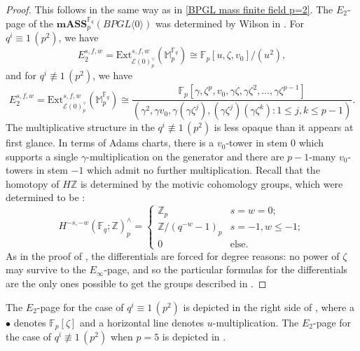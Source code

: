 \documentclass{amsart}
\theoremstyle{plain}
\numberwithin{theorem}{section}
\numberwithin{equation}{section}
\numberwithin{figure}{section}
\newcommand{\0}{\langle 0 \rangle }
\begin{document}
\begin{proof}
    This follows in the same way as in \cref{BPGL mass finite field p=2}. The $E_2$-page of the $\textbf{mASS}^{\mathbb{F}_q}_p(BPGL \langle 0 \rangle)$ was determined by Wilson in \cite[Proposition 6.4, Proposition 7.7]{Wilson16}. For $q^i \equiv 1 \, (p^2)$, we have
    \[E_2^{s,f,w}=\text{Ext}^{s,f,w}_{\mathcal{E}(0)^\vee_p}(\mathbb{M}_p^{\mathbb{F}_q}) \cong        \mathbb{F}_p[u, \zeta, v_0]/(u^2), \]
    and for $q^i \not\equiv 1 \, (p^2)$, we have
    \[E_2^{s,f,w}=\text{Ext}_{\mathcal{E}(0)^\vee_p}^{s,f,w}(\mathbb{M}_p^{\mathbb{F}_q}) \cong \frac{\mathbb{F}_p[\gamma, \zeta^p, v_0, \gamma\zeta, \gamma\zeta^2, \dots, \gamma\zeta^{p-1}]}{(\gamma^2, \gamma v_0, \gamma(\gamma\zeta^j), (\gamma\zeta^j)(\gamma\zeta^k) : 1 \leq j, k \leq p-1)}.\]
    The multiplicative structure in the $q^i \not\equiv 1 \, (p^2)$ is less opaque than it appears at first glance. In terms of Adams charts, there is a $v_0$-tower in stem 0 which supports a single $\gamma$-multiplication on the generator and there are $p-1$-many $v_0$-towers in stem $-1$ which admit no further multiplication. Recall that the homotopy of $H\mathbb{Z}$ is determined by the motivic cohomology groups, which were determined to be \cite{Soule79}:
    \begin{equation}
    \label{eq:FinitefieldMotivicCohomologypComplete}
    H^{-s,-w}(\mathbb{F}_q;\mathbb{Z})_p^\wedge = \left\{\begin{array}{rl}
    \mathbb{Z}_p & s=w=0; \\
    \mathbb{Z}/(q^{-w}-1)_p & s=-1, w \leq -1;\\
    0 & \text{else}.
    \end{array}\right.
    \end{equation}       
    As in the proof of , the differentials are forced for degree reasons: no power of $\zeta$ may survive to the $E_\infty$-page, and so the particular formulas for the differentials are the only ones possible to get the groups described in .
\end{proof}

The $E_2$-page for the case of $q^i \equiv 1 \, (p^2)$ is depicted in the right side of , where a $\bullet$ denotes $\mathbb{F}_p[\zeta]$ and a horizontal line denotes $u$-multiplication. The $E_2$-page for the case of $q^i \not \equiv 1 \, (p^2)$ when $p=5$ is depicted in .
\end{document}
